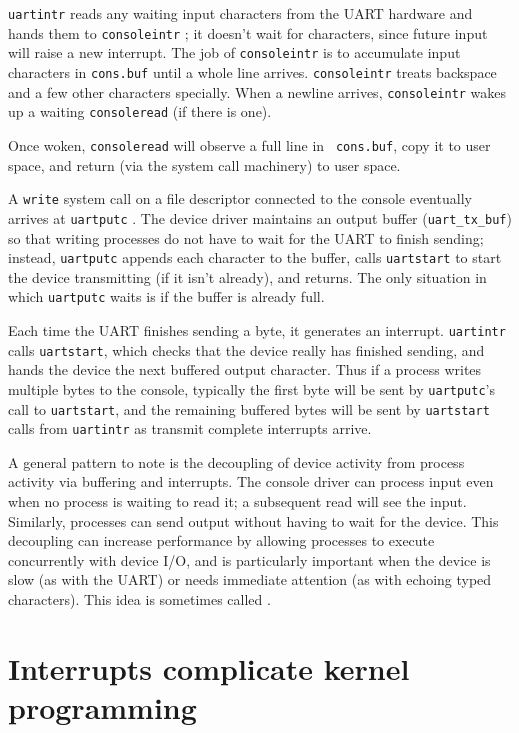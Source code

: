 {\tt uartintr}
reads any waiting input characters from the UART hardware
and hands them to {\tt consoleintr}
; it doesn't
wait for characters, since future input will raise a new interrupt.
The job of {\tt consoleintr} is to accumulate input characters in
{\tt cons.buf} 
until a whole line arrives.
{\tt consoleintr} treats backspace and a few other characters
specially.
When a newline arrives, {\tt consoleintr} wakes up a
waiting {\tt consoleread} (if there is one).

Once woken, {\tt consoleread} will observe a full line in {\tt
  cons.buf}, copy it to user space, and return (via the system call
machinery) to user space.

A {\tt write} system call on a file descriptor connected to the console
eventually arrives at 
{\tt uartputc}
.
The device driver maintains an output buffer ({\tt uart\_tx\_buf})
so that writing processes do not have to wait for the UART to finish
sending; instead, {\tt uartputc} appends each character to the buffer,
calls {\tt uartstart} to start the device transmitting (if it isn't
already), and returns. The only situation in which {\tt uartputc}
waits is if the buffer is already full.

Each time the UART finishes sending a byte, it generates an interrupt.
{\tt uartintr} calls {\tt uartstart}, which checks that the device
really has finished sending, and hands the device the next buffered
output character. Thus if a process writes multiple bytes to the
console, typically the first byte will be sent by {\tt uartputc}'s
call to {\tt uartstart}, and the remaining buffered bytes will be sent
by {\tt uartstart} calls from {\tt uartintr} as transmit complete
interrupts arrive.

A general pattern to note is the decoupling of device activity from
process activity via buffering and interrupts. The console driver can
process input even when no process is waiting to read it; a subsequent
read will see the input. Similarly, processes can send output without
having to wait for the device. This decoupling can increase
performance by allowing processes to execute concurrently with device
I/O, and is particularly important when the device is slow (as with
the UART) or needs immediate attention (as with echoing typed
characters). This idea is sometimes called .

\section{Interrupts complicate kernel programming}

